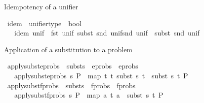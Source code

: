 \begin{isabellebody}
\begin{isamarkuptext}%
Idempotency of a unifier%
\end{isamarkuptext}\isamarkuptrue%
\isamarkupfalse%
\ idem\ {\isacharcolon}{\kern0pt}{\isacharcolon}{\kern0pt}\ {\isachardoublequoteopen}unifier{\isacharunderscore}{\kern0pt}type\ {\isasymRightarrow}\ bool{\isachardoublequoteclose}\isanewline
\ \ \ {\isachardoublequoteopen}idem\ unif\ {\isasymequiv}\ {\isacharparenleft}{\kern0pt}fst\ unif{\isacharparenright}{\kern0pt}{\isasymTurnstile}\ subst\ {\isacharparenleft}{\kern0pt}{\isacharparenleft}{\kern0pt}snd\ unif{\isacharparenright}{\kern0pt}{\isasymbullet}{\isacharparenleft}{\kern0pt}snd\ unif{\isacharparenright}{\kern0pt}{\isacharparenright}{\kern0pt}\ {\isasymapprox}\ subst\ {\isacharparenleft}{\kern0pt}snd\ unif{\isacharparenright}{\kern0pt}{\isachardoublequoteclose}%
\begin{isamarkuptext}%
Application of a substitution to a problem%
\end{isamarkuptext}\isamarkuptrue%
\isamarkupfalse%
\ apply{\isacharunderscore}{\kern0pt}subst{\isacharunderscore}{\kern0pt}eprobs\ {\isacharcolon}{\kern0pt}{\isacharcolon}{\kern0pt}\ {\isachardoublequoteopen}substs\ {\isasymRightarrow}\ eprobs\ {\isasymRightarrow}\ eprobs{\isachardoublequoteclose}\isanewline
\ \ \ {\isachardoublequoteopen}apply{\isacharunderscore}{\kern0pt}subst{\isacharunderscore}{\kern0pt}eprobs\ s\ P\ {\isasymequiv}\ map\ {\isacharparenleft}{\kern0pt}{\isasymlambda}{\isacharparenleft}{\kern0pt}t{}{\isacharcomma}{\kern0pt}\ t{}{\isacharparenright}{\kern0pt}{\isachardot}{\kern0pt}\ {\isacharparenleft}{\kern0pt}subst\ s\ t{}\ {\isasymapprox}{\isacharquery}{\kern0pt}\ subst\ s\ t{}{\isacharparenright}{\kern0pt}{\isacharparenright}{\kern0pt}\ P{\isachardoublequoteclose}\isanewline
\isanewline
{}\isamarkupfalse%
\ apply{\isacharunderscore}{\kern0pt}subst{\isacharunderscore}{\kern0pt}fprobs\ {\isacharcolon}{\kern0pt}{\isacharcolon}{\kern0pt}\ {\isachardoublequoteopen}substs\ {\isasymRightarrow}\ fprobs\ {\isasymRightarrow}\ fprobs{\isachardoublequoteclose}\isanewline
\ \ \ {\isachardoublequoteopen}apply{\isacharunderscore}{\kern0pt}subst{\isacharunderscore}{\kern0pt}fprobs\ s\ P\ {\isasymequiv}\ map\ {\isacharparenleft}{\kern0pt}{\isasymlambda}{\isacharparenleft}{\kern0pt}a{\isacharcomma}{\kern0pt}\ t{\isacharparenright}{\kern0pt}{\isachardot}{\kern0pt}\ {\isacharparenleft}{\kern0pt}a\ {\isasymsharp}{\isacharquery}{\kern0pt}\ subst\ s\ t{\isacharparenright}{\kern0pt}{\isacharparenright}{\kern0pt}\ P{\isachardoublequoteclose}\isanewline

\end{isabellebody}
